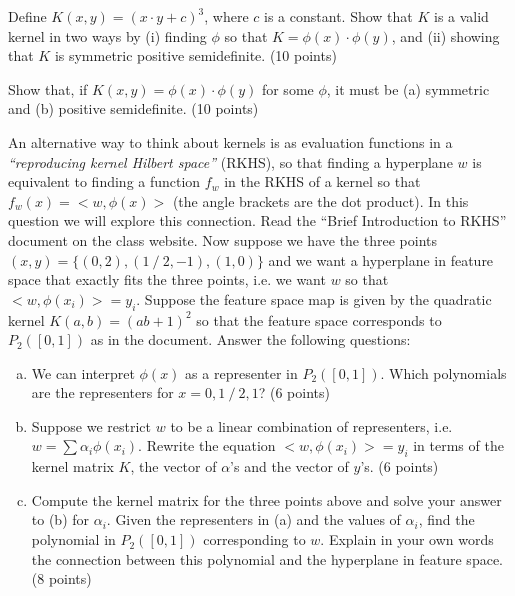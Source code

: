 \documentclass[fleqn]{homework}
\begin{document}
  \begin{problem}{2}
    \begin{question}
      Define $K(x,y)=(x \cdot y+c)^3$, where $c$ is a constant. Show that $K$ is
      a valid kernel in two ways by (i) finding $\phi$ so that
      $K = \phi(x) \cdot \phi(y)$, and (ii) showing that $K$ is symmetric
      positive semidefinite. (10 points)
    \end{question}
  \end{problem}

  \begin{problem}{3}
    \begin{question}
      Show that, if $K(x,y) = \phi(x) \cdot \phi(y)$ for some $\phi$, it must be
      (a) symmetric and (b) positive semidefinite. (10 points)
    \end{question}
  \end{problem}

  \begin{problem}{4}
    \begin{question}
      An alternative way to think about kernels is as evaluation functions in a
      \textit{“reproducing kernel Hilbert space”} (RKHS), so that finding a
      hyperplane $w$ is equivalent to finding a function $f_w$ in the RKHS of a
      kernel so that $f_w(x)=<w, \phi(x)>$ (the angle brackets are the dot
      product). In this question we will explore this connection. Read the
      ``Brief Introduction to RKHS'' document on the class website. Now suppose
      we have the three points $(x,y)=\{(0,2), (1⁄2,−1), (1,0)\}$ and we want a
      hyperplane in feature space that exactly fits the three points, i.e. we
      want $w$ so that $<w, \phi(x_i)>=y_i$. Suppose the feature space map is
      given by the quadratic kernel $K(a,b)=(ab+1)^2$ so that the feature space
      corresponds to $P_2([0,1])$ as in the document. Answer the following
      questions:

      \begin{enumerate}[(a)]
      \item We can interpret $\phi(x)$ as a representer in $P_2([0,1])$. Which
        polynomials are the representers for $x=0, 1⁄2, 1$? (6 points)
      \item Suppose we restrict $w$ to be a linear combination of representers,
        i.e. $w=\sum α_i \phi(x_i)$. Rewrite the equation $<w, \phi(x_i)>=y_i$
        in terms of the kernel matrix $K$, the vector of $\alpha$’s and the
        vector of $y$’s. (6 points)
      \item Compute the kernel matrix for the three points above and solve your
        answer to (b) for $\alpha_i$.  Given the representers in (a) and the
        values of $\alpha_i$, find the polynomial in $P_2([0,1])$ corresponding
        to $w$. Explain in your own words the connection between this polynomial
        and the hyperplane in feature space. (8 points)
      \end{enumerate}
    \end{question}
  \end{problem}
\end{document}
